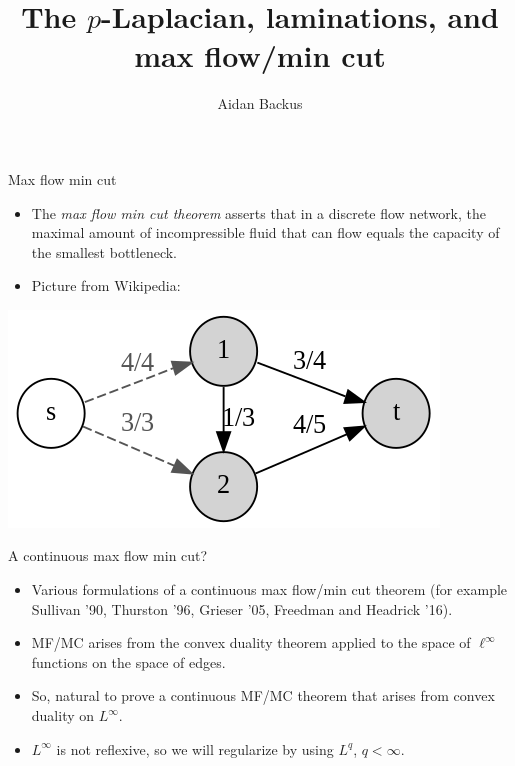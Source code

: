 \documentclass[10pt]{beamer}
\title[$p$-Laplacian and max flow/min cut]{The $p$-Laplacian, laminations, and max flow/min cut}
\author{Aidan Backus}
\begin{document}
\begin{frame}
    \titlepage
\end{frame}

\begin{frame}{Max flow min cut}
\begin{itemize}
\item The \emph{max flow min cut theorem} asserts that in a discrete flow network, the maximal amount of incompressible fluid that can flow equals the capacity of the smallest bottleneck. \pause
\item Picture from Wikipedia:
\end{itemize}

\begin{center}
    \includegraphics[scale=0.75]{Max-flow_min-cut_example.svg.png}
\end{center}
\end{frame}

\begin{frame}{A continuous max flow min cut?}
\begin{itemize}
\item Various formulations of a continuous max flow/min cut theorem (for example Sullivan '90, Thurston '96, Grieser '05, Freedman and Headrick '16). \pause
\item MF/MC arises from the convex duality theorem applied to the space of $\ell^\infty$ functions on the space of edges. \pause
\item So, natural to prove a continuous MF/MC theorem that arises from convex duality on $L^\infty$. \pause
\item $L^\infty$ is not reflexive, so we will regularize by using $L^q$, $q < \infty$.
\end{itemize}
    
\end{frame}
\end{document}

